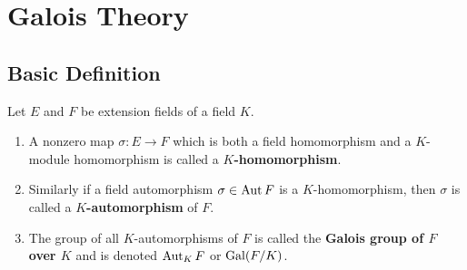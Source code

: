 \chapter{Galois Theory} %

\section{Basic Definition} %

\begin{definition} %
    Let $E$ and $F$ be extension fields of a field $K$.  \label{1232}
    \begin{enumerate}
        \item
              A nonzero map $\sigma: E \rightarrow {F}$ which is both a field homomorphism and a $K$-module homomorphism is called a \textbf{$K$-homomorphism}.

        \item
              Similarly if a field automorphism $\sigma \in \operatorname{\operatorname{Aut}} F$ is a $K$-homomorphism, then $\sigma$ is called a \textbf{$K$-automorphism} of $F$.

        \item
              The group of all $K$-automorphisms of $F$ is called the \textbf{Galois group of $F$ over $K$} and is denoted $\operatorname{\operatorname{Aut}}_K F$ or $\operatorname{\operatorname{Gal}}(F/K)$.
    \end{enumerate}

\end{definition}


